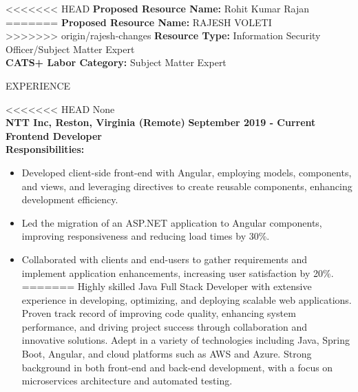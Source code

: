 \documentclass{resume} %
\begin{document}
\begin{flushleft}
<<<<<<< HEAD
    \textbf{Proposed Resource Name:} Rohit Kumar Rajan \\
=======
    \textbf{Proposed Resource Name:} RAJESH VOLETI \\
>>>>>>> origin/rajesh-changes
    \textbf{Resource Type:} Information Security Officer/Subject Matter Expert \\
    \textbf{CATS+ Labor Category:} Subject Matter Expert
\end{flushleft}

\vspace{1.3em}

\begin{rSection}{EXPERIENCE}
        \begin{flushleft}
<<<<<<< HEAD
        None \\
        \vspace{1em} 
            \textbf{NTT Inc, Reston, Virginia (Remote)} \hfill \textbf{September 2019 {-} Current} \\
            \textbf{Frontend Developer} \\
            \vspace{1em}
            \textbf{Responsibilities:} \\
            \begin{itemize}
                                    \item Developed client{-}side front{-}end with Angular, employing models, components, and views, and leveraging directives to create reusable components, enhancing development efficiency.
                                    \item Led the migration of an ASP.NET application to Angular components, improving responsiveness and reducing load times by 30\%.
                                    \item Collaborated with clients and end{-}users to gather requirements and implement application enhancements, increasing user satisfaction by 20\%.
=======
        Highly skilled Java Full Stack Developer with extensive experience in developing, optimizing, and deploying scalable web applications. Proven track record of improving code quality, enhancing system performance, and driving project success through collaboration and innovative solutions. Adept in a variety of technologies including Java, Spring Boot, Angular, and cloud platforms such as AWS and Azure. Strong background in both front{-}end and back{-}end development, with a focus on microservices architecture and automated testing. \\

\end{itemize}
\end{flushleft}
\end{rSection}
\end{document}
